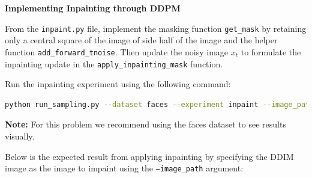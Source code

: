  \textbf{Implementing Inpainting through DDPM}

From the \texttt{inpaint.py} file, implement the masking function \texttt{get\_mask} by retaining only a central square of the image of side half of the image and 
the helper function \texttt{add\_forward\_tnoise}. Then update the noisy image $x_t$ to formulate the inpainting update in the \texttt{apply\_inpainting\_mask} function.

Run the inpainting experiment using the following command:
\begin{lstlisting}[language=bash]
    python run_sampling.py --dataset faces --experiment inpaint --image_path /path/to/image/to/inpaint
\end{lstlisting}

\textbf{Note: }For this problem we recommend using the faces dataset to see results visually. 

Below is the expected result from applying inpainting by specifying the DDIM image as the image to impaint using the \texttt{--image\_path} argument:

